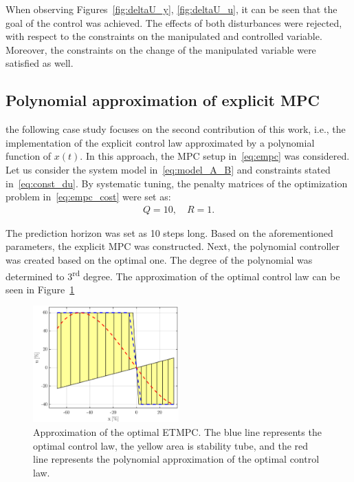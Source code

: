 \documentclass[letterpaper, 10 pt, conference]{ieeeconf}
\begin{document}
When observing Figures~\ref{fig:deltaU_y}, \ref{fig:deltaU_u}, it can be seen that the goal of the control was achieved. The effects of both disturbances were rejected, with respect to the constraints on the manipulated and controlled variable. Moreover, the constraints on the change of the manipulated variable were satisfied as well.

\subsection{Polynomial approximation of explicit MPC}
\label{sec:polynomial_exp}
the following case study focuses on the second contribution of this work, i.e., the implementation of the explicit control law approximated by a polynomial function of $x(t)$. In this approach, the MPC setup in~\eqref{eq:empc} was considered. Let us consider the system model in~\eqref{eq:model_A_B} and constraints stated in~\eqref{eq:const_du}. By systematic tuning, the penalty matrices of the optimization problem in~\eqref{eq:empc_cost} were set as:	
\begin{eqnarray}
\label{eq:setup_penalty_pol} 
	Q = 10, \quad R = 1.
\end{eqnarray}


The prediction horizon was set as 10 steps long. Based on the aforementioned parameters, the explicit MPC was constructed. Next, the polynomial controller was created based on the optimal one. The degree of the polynomial was determined to 3\textsuperscript{rd} degree. The approximation of the optimal control law can be seen in Figure~\ref{fig:approx}
 

\begin{figure}
	\begin{center}
		\includegraphics[width=0.5\textwidth]{images/approximation.eps}
		\caption{Approximation of the optimal ETMPC. The blue line represents the optimal control law, the yellow area is stability tube, and the red line represents the polynomial approximation of the optimal control law.}
		\label{fig:approx}
	\end{center}
\end{figure}
\end{document}
